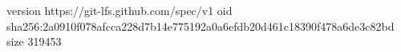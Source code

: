 version https://git-lfs.github.com/spec/v1
oid sha256:2a0910f078afcca228d7b14e775192a0a6efdb20d461c18390f478a6de3c82bd
size 319453
